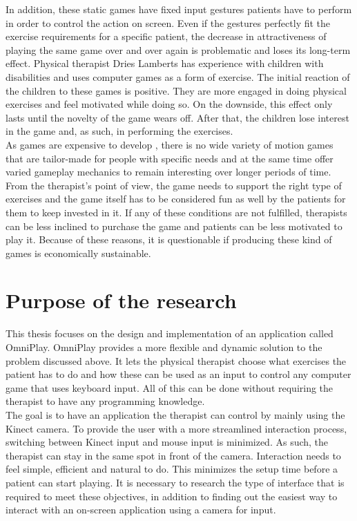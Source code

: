 In addition, these static games have fixed input gestures patients have to perform in order to control the action on screen. Even if the gestures perfectly fit the exercise requirements for a specific patient, the decrease in attractiveness of playing the same game over and over again is problematic and loses its long-term effect. Physical therapist Dries Lamberts has experience with children with disabilities and uses computer games as a form of exercise. The initial reaction of the children to these games is positive. They are more engaged in doing physical exercises and feel motivated while doing so. On the downside, this effect only lasts until the novelty of the game wears off. After that, the children lose interest in the game and, as such, in performing the exercises.\\

As games are expensive to develop \cite{Nakevska2011}, there is no wide variety of motion games that are tailor-made for people with specific needs and at the same time offer varied gameplay mechanics to remain interesting over longer periods of time. From the therapist's point of view, the game needs to support the right type of exercises and the game itself has to be considered fun as well by the patients for them to keep invested in it. If any of these conditions are not fulfilled, therapists can be less inclined to purchase the game and patients can be less motivated to play it. Because of these reasons, it is questionable if producing these kind of games is economically sustainable.


\section{Purpose of the research}

This thesis focuses on the design and implementation of an application called OmniPlay. OmniPlay provides a more flexible and dynamic solution to the problem discussed above. It lets the physical therapist choose what exercises the patient has to do and how these can be used as an input to control any computer game that uses keyboard input. All of this can be done without requiring the therapist to have any programming knowledge.\\

The goal is to have an application the therapist can control by mainly using the Kinect camera. To provide the user with a more streamlined interaction process, switching between Kinect input and mouse input is minimized. As such, the therapist can stay in the same spot in front of the camera. Interaction needs to feel simple, efficient and natural to do. This minimizes the setup time before a patient can start playing. It is necessary to research the type of interface that is required to meet these objectives, in addition to finding out the easiest way to interact with an on-screen application using a camera for input.
